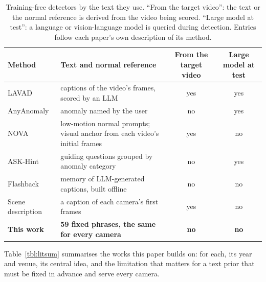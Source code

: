 \documentclass[a4paper,fleqn]{cas-sc}
\begin{document}
\begin{table}[width=\linewidth,cols=4,pos=htbp]
\caption{Training-free detectors by the text they use. ``From the target video'': the
text or the normal reference is derived from the video being scored. ``Large model at
test'': a language or vision-language model is queried during detection. Entries
follow each paper's own description of its method.}\label{tbl:position}
\small
\begin{tabularx}{\linewidth}{@{}l Z c c@{}}
\toprule
\textbf{Method} & \textbf{Text and normal reference} & \textbf{From the target video} & \textbf{Large model at test} \\
\midrule
LAVAD \citep{zanella2024lavad} & captions of the video's frames, scored by an LLM & yes & yes \\
AnyAnomaly \citep{anyanomaly2025} & anomaly named by the user & no & yes \\
NOVA \citep{yin2026nova} & low-motion normal prompts; visual anchor from each video's initial frames & yes & no \\
ASK-Hint \citep{zou2026askhint} & guiding questions grouped by anomaly category & no & yes \\
Flashback \citep{lee2025flashback} & memory of LLM-generated captions, built offline & no & no \\
Scene description \citep{sarangi2026concept} & a caption of each camera's first frames & yes & no \\
\textbf{This work} & \textbf{59 fixed phrases, the same for every camera} & \textbf{no} & \textbf{no} \\
\bottomrule
\end{tabularx}
\end{table}

Table~\ref{tbl:litsum} summarises the works this paper builds on: for each, its year
and venue, its central idea, and the limitation that matters for a text prior that must
be fixed in advance and serve every camera.
\end{document}
